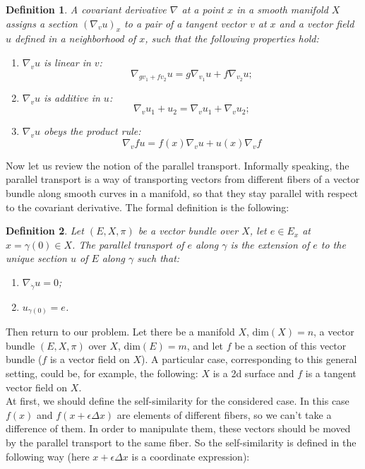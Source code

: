 \documentclass[a4paper,twoside]{article}
\newtheorem{definition}{Definition}
\newcommand{\delx}{\Delta x}
\begin{document}
\begin{definition}
A covariant derivative $\nabla$  at a point $x$ in a smooth manifold $X$  assigns a section $(\nabla_v u)_x$ to a pair of a tangent vector $v$ at $x$ and a vector field $u$ defined in a neighborhood of $x$, such that the following properties hold:
\begin{enumerate}
\item $\nabla_v u$ is linear in $v$:
$$\nabla_{g v_1 + f v_2} u = g\nabla_{v_1} u + f\nabla_{v_2} u;$$
\item $\nabla_v u$  is additive in $u$:
$$\nabla_{v} u_1 + u_2 = \nabla_{v} u_1 + \nabla_{v} u_2;$$
\item $\nabla_v u$ obeys the product rule:
$$\nabla_v f u = f(x) \nabla_v u + u(x)\nabla_v f$$
\end{enumerate}
\end{definition} 
Now let us review the notion of the parallel transport. Informally speaking, the parallel transport is a way of transporting vectors from different fibers of a vector bundle along smooth curves in a manifold, so that they stay parallel with respect to the covariant derivative. The formal definition is the following:
\begin{definition}
Let $(E, X, \pi)$ be a vector bundle over $X$, let $e \in E_x$ at $x = \gamma(0) \in X$. The parallel transport of $e$ along $\gamma$ is the extension of $e$ to the unique section $u$ of $E$ along $\gamma$ such that:
\begin{enumerate}
\item $\nabla_{\dot{\gamma}} u = 0$;
\item $u_{\gamma (0)}=e$.
\end{enumerate}
\end{definition}
Then return to our problem. Let there be a manifold $X$, $\mathrm{dim}(X) = n$, a vector bundle $(E, X, \pi)$ over $X$, $\mathrm{dim}(E) = m$, and let $f$ be a section of this vector bundle ($f$ is a vector field on $X$). A particular case, corresponding to this general setting, could be, for example, the following: $X$ is a 2d surface and $f$ is a tangent vector field on $X$.
\\
At first, we should define the self-similarity for the considered case. In this case $f(x)$ and $f(x + \epsilon\delx)$ are elements of different fibers, so we can't take a difference of them. In order to manipulate them, these vectors should be moved by the parallel transport to the same fiber. So the self-similarity is defined in the following way (here $x+\epsilon\delx$ is a coordinate expression): 
\end{document}
